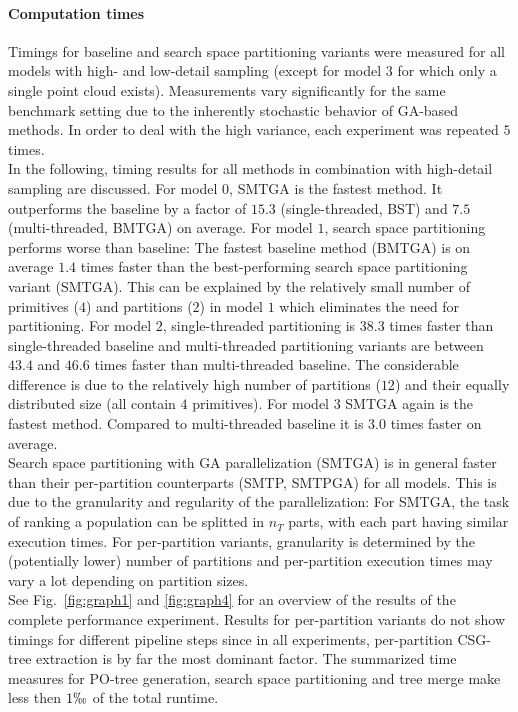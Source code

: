 \paragraph{Computation times}  
Timings for baseline and search space partitioning variants were measured for all models with high- and low-detail sampling (except for model $3$ for which only a single point cloud exists).
Measurements vary significantly for the same benchmark setting due to the inherently stochastic behavior of \ac{GA}-based methods. 
In order to deal with the high variance, each experiment was repeated $5$ times.
\\
In the following, timing results for all methods in combination with high-detail sampling are discussed.
For model $0$, SMTGA is the fastest method. 
It outperforms the baseline by a factor of $15.3$ (single-threaded, BST) and $7.5$ (multi-threaded, BMTGA) on average.
For model $1$, search space partitioning performs worse than baseline: 
The fastest baseline method (BMTGA) is on average $1.4$ times faster than the best-performing search space partitioning variant (SMTGA).
This can be explained by the relatively small number of primitives ($4$) and partitions ($2$) in model $1$ which eliminates the need for partitioning.
For model $2$, single-threaded partitioning is $38.3$ times faster than single-threaded baseline and multi-threaded partitioning variants are between $43.4$ and $46.6$ times faster than multi-threaded baseline.  
The considerable difference is due to the relatively high number of partitions ($12$) and their equally distributed size (all contain $4$ primitives).
For model $3$ SMTGA again is the fastest method. 
Compared to multi-threaded baseline it is $3.0$ times faster on average.
\\
Search space partitioning with \ac{GA} parallelization (SMTGA) is in general faster than their per-partition counterparts (SMTP, SMTPGA) for all models.
This is due to the granularity and regularity of the parallelization: 
For SMTGA, the task of ranking a population can be splitted in $n_T$ parts, with each part having similar execution times.
For per-partition variants, granularity is determined by the (potentially lower) number of partitions and per-partition execution times may vary a lot depending on partition sizes. 
\\
See Fig.~\ref{fig:graph1} and \ref{fig:graph4} for an overview of the results of the complete performance experiment.
Results for per-partition variants do not show timings for different pipeline steps since in all experiments, per-partition \ac{CSG}-tree extraction is by far the most dominant factor. 
The summarized time measures for \ac{PO}-tree generation, search space partitioning and tree merge make less then $1\permil$ of the total runtime.


